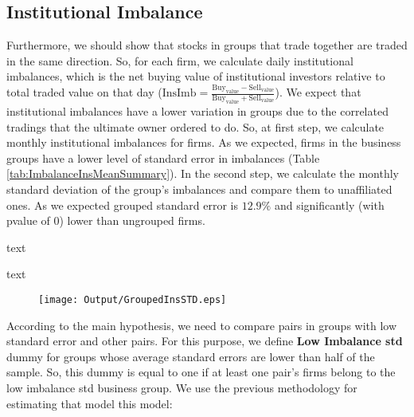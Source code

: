 \FloatBarrier





\subsection{{Institutional Imbalance}}

	Furthermore, we should show that stocks in groups that trade together are traded in the same direction. So, for each firm, we calculate daily institutional imbalances, which is the net buying value of institutional investors relative to total traded value on that day ($ \text{InsImb} = \frac{\text{Buy}_{\text{value}} - \text{Sell}_{\text{value}}}{\text{Buy}_{\text{value}} + \text{Sell}_{\text{value}}} $).\cite{seasholes2007predictable} 
	We expect that institutional imbalances have a lower variation in groups due to the correlated tradings that the ultimate owner ordered to do. So, at first step, we calculate monthly institutional imbalances for firms. As we expected, firms in the business groups have a lower level of standard error in  imbalances (Table \ref{tab:ImbalanceInsMeanSummary}). In the second step, 	 we calculate the monthly standard deviation of the group's imbalances and compare them to unaffiliated ones. As we expected grouped standard error is  $12.9\%$ and significantly (with pvalue of 0) lower than ungrouped firms. 
	
	{\begin{table}[htbp]
		\centering
		\caption{text}
		\resizebox{0.75\textwidth}{!}{
			
		}
		\label{tab:ImbalanceInsMeanSummary}%
	\end{table}}
	{\begin{table}[htbp]
		\centering
		\caption{text}
		\resizebox{0.75\textwidth}{!}{
			
		}
		\label{tab:ImbalanceInsStdSummary}%
\end{table}}
	\begin{figure}[htbp]
		\centering
		\texttt{[image: Output/GroupedInsSTD.eps]}
		\label{fig:GroupedInsSTD}
	\end{figure}
	
	According to the main hypothesis, we need to compare pairs in groups with low standard error and other pairs.
	For this purpose, we define \textbf{Low Imbalance std} dummy for groups whose average standard errors are lower than half of the sample. 
	So, this dummy is equal to one if at least one pair's firms belong to the low imbalance std business group.  We use the previous methodology for estimating that model this model:
	
	
